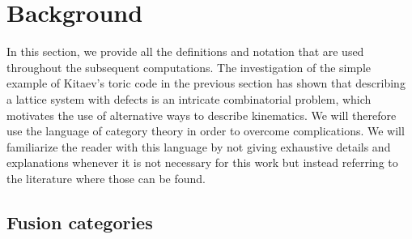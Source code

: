 \documentclass[aps,prb,twocolumn,superscriptaddress,noshowkeys]{revtex4-2}  %
\theoremstyle{plain}%
\theoremstyle{definition}
\theoremstyle{remark}
\begin{document}
\section{Background}\label{S:defs}
In this section, we provide all the definitions and notation that are used throughout the subsequent computations.
The investigation of the simple example of Kitaev's toric code in the previous section has shown that describing a lattice system with defects is an intricate combinatorial problem, which motivates the use of alternative ways to describe kinematics. We will therefore use the language of category theory in order to overcome complications. We will familiarize the reader with this language by not giving exhaustive details and explanations whenever it is not necessary for this work but instead referring to the literature where those can be found.

\subsection{Fusion categories}
\end{document}

